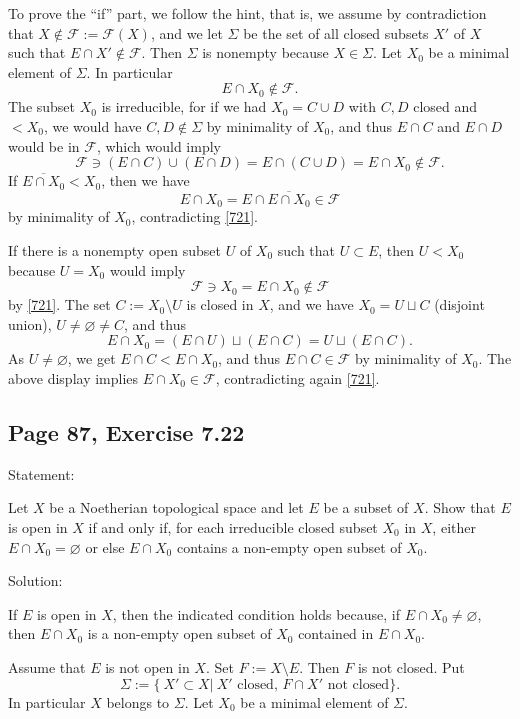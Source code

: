 \documentclass[parskip=half,fontsize=12pt]{scrartcl}%
\begin{document}
To prove the ``if'' part, we follow the hint, that is, we assume by contradiction that $X\notin\mathcal F:=\mathcal F(X)$, and we let $\Sigma$ be the set of all closed subsets $X'$ of $X$ such that $E\cap X'\notin\mathcal F$. Then $\Sigma$ is nonempty because %
$X\in\Sigma$. Let $X_0$ be a minimal element of $\Sigma$. In particular 
%
\begin{equation}\label{721}
E\cap X_0\notin\mathcal F.
\end{equation}
%  
The subset $X_0$ is irreducible, for if we had $X_0=C\cup D$ with $C,D$ closed and $<X_0$, we would have $C,D\notin\Sigma$ by minimality of $X_0$, and thus $E\cap C$ and $E\cap D$ would be in $\mathcal F$, which would imply 
$$
\mathcal F\ni(E\cap C)\cup(E\cap D)=E\cap(C\cup D)=E\cap X_0\notin\mathcal F.
$$ 
If $\overline{E\cap X_0}<X_0$, then we have 
$$
E\cap X_0=E\cap\overline{E\cap X_0}\in\mathcal F
$$ 
by minimality of $X_0$, contradicting \eqref{721}. 

If there is a nonempty open subset $U$ of $X_0$ such that $U\subset E$, then $U<X_0$ because $U=X_0$ would imply 
$$
\mathcal F\ni X_0=E\cap X_0\notin\mathcal F
$$ 
by \eqref{721}. The set $C:=X_0\setminus U$ is closed in $X$, and we have $X_0=U\sqcup C$ (disjoint union), $U\ne\varnothing\ne C$, and thus
$$
E\cap X_0=(E\cap U)\sqcup(E\cap C)=U\sqcup(E\cap C).
$$ 
As $U\ne\varnothing$, we get $E\cap C<E\cap X_0$, and thus $E\cap C\in\mathcal F$ by minimality of $X_0$. The above display implies $E\cap X_0\in\mathcal F$, contradicting again \eqref{721}. 

\subsection{Page 87, Exercise 7.22}%

Statement: 

Let $X$ be a Noetherian topological space and let $E$ be a subset of $X$. Show that $E$ is open in $X$ if and only if, for each irreducible closed subset $X_0$ in $X$, either $E\cap X_0=\varnothing$ or else $E\cap X_0$ contains a non-empty open subset of $X_0$.

Solution: 

If $E$ is open in $X$, then the indicated condition holds because, if $E\cap X_0\ne\varnothing$, then $E\cap X_0$ is a non-empty open subset of $X_0$ contained in $E\cap X_0$. %

Assume that $E$ is not open in $X$. Set $F:=X\setminus E$. Then $F$ is not closed. Put 
$$
\Sigma:=\{\ X'\subset X|\ X'\text{ closed, }F\cap X'\text{ not closed}\}.
$$ 
In particular $X$ belongs to $\Sigma$. Let $X_0$ be a minimal element of $\Sigma$. 
\end{document}
